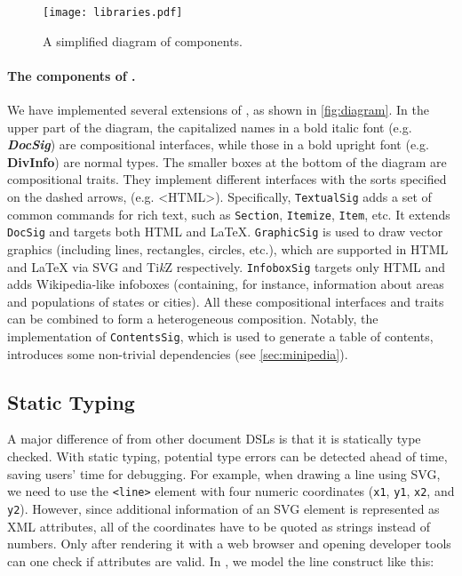 \begin{figure}
  \texttt{[image: libraries.pdf]}
  \caption{A simplified diagram of \ExT components.} \label{fig:diagram}
\end{figure}

\paragraph{The components of \ExT.}
We have implemented several extensions of \ExT, as shown in
\autoref{fig:diagram}. In the upper part of the diagram, the capitalized names
in a bold italic font (e.g. {\small \sffamily \bfseries \itshape DocSig}) are
compositional interfaces, while those in a bold upright font (e.g. {\small
\sffamily \bfseries DivInfo}) are normal types. The smaller boxes at the bottom
of the diagram are compositional traits. They implement different interfaces
with the sorts specified on the dashed arrows, (e.g. {\small \sffamily <HTML>}).
Specifically, \lstinline{TextualSig} adds a set of common commands for rich
text, such as \lstinline{Section}, \lstinline{Itemize}, \lstinline{Item}, etc.
It extends \lstinline{DocSig} and targets both HTML and \LaTeX.
\lstinline{GraphicSig} is used to draw vector graphics (including lines,
rectangles, circles, etc.), which are supported in HTML and \LaTeX{} via SVG and
Ti\emph{k}Z respectively. \lstinline{InfoboxSig} targets only HTML and adds
Wikipedia-like infoboxes (containing, for instance, information about areas and
populations of states or cities). All these compositional interfaces and traits
can be combined to form a heterogeneous composition. Notably, the implementation
of \lstinline{ContentsSig}, which is used to generate a table of contents,
introduces some non-trivial dependencies (see \autoref{sec:minipedia}).

\subsection{Static Typing} \label{sec:typing}

A major difference of \ExT from other document DSLs is that it is statically
type checked. With static typing, potential type errors can be detected ahead of
time, saving users' time for debugging. For example, when drawing a line using
SVG, we need to use the \lstinline{<line>} element with four numeric coordinates
(\lstinline{x1}, \lstinline{y1}, \lstinline{x2}, and \lstinline{y2}). However,
since additional information of an SVG element is represented as XML attributes,
all of the coordinates have to be quoted as strings instead of numbers. Only
after rendering it with a web browser and opening developer tools can one check
if attributes are valid. In \ExT, we model the line construct like this:

